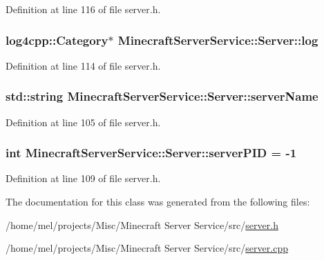 Definition at line 116 of file server.\+h.

\subsubsection[{\texorpdfstring{log}{log}}]{\setlength{\rightskip}{0pt plus 5cm}log4cpp\+::\+Category$\ast$ Minecraft\+Server\+Service\+::\+Server\+::log\hspace{0.3cm}{\ttfamily [protected]}}\hypertarget{class_minecraft_server_service_1_1_server_aea87340c35422279f868ecf8edc4a9f6}{}\label{class_minecraft_server_service_1_1_server_aea87340c35422279f868ecf8edc4a9f6}


Definition at line 114 of file server.\+h.

\subsubsection[{\texorpdfstring{server\+Name}{serverName}}]{\setlength{\rightskip}{0pt plus 5cm}std\+::string Minecraft\+Server\+Service\+::\+Server\+::server\+Name}\hypertarget{class_minecraft_server_service_1_1_server_a4a4a359e824e19e2a0c4d105ee4fad91}{}\label{class_minecraft_server_service_1_1_server_a4a4a359e824e19e2a0c4d105ee4fad91}


Definition at line 105 of file server.\+h.

\subsubsection[{\texorpdfstring{server\+P\+ID}{serverPID}}]{\setlength{\rightskip}{0pt plus 5cm}int Minecraft\+Server\+Service\+::\+Server\+::server\+P\+ID = -\/1\hspace{0.3cm}{\ttfamily [protected]}}\hypertarget{class_minecraft_server_service_1_1_server_abdb911338643b10beee5393851afb4c8}{}\label{class_minecraft_server_service_1_1_server_abdb911338643b10beee5393851afb4c8}


Definition at line 109 of file server.\+h.



The documentation for this class was generated from the following files\+:\begin{DoxyCompactItemize}
\item 
/home/mel/projects/\+Misc/\+Minecraft Server Service/src/\hyperlink{server_8h}{server.\+h}\item 
/home/mel/projects/\+Misc/\+Minecraft Server Service/src/\hyperlink{server_8cpp}{server.\+cpp}\end{DoxyCompactItemize}
